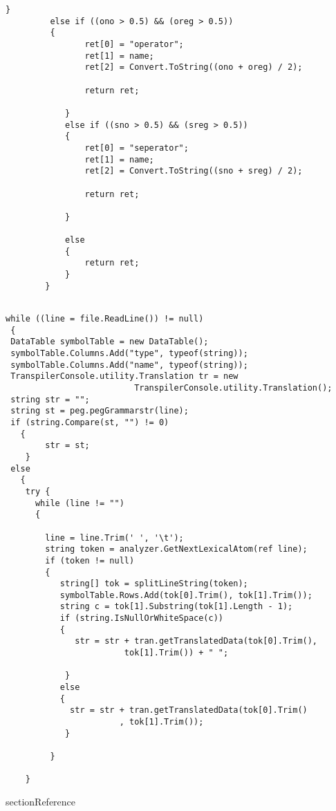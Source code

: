 \documentclass[23pt]{article}
\begin{document}
\begin{lstlisting}[label=some-code,caption= Code for training the system]
         }
         else if ((ono > 0.5) && (oreg > 0.5))
         {
                ret[0] = "operator";
                ret[1] = name;
                ret[2] = Convert.ToString((ono + oreg) / 2);

                return ret;

            }
            else if ((sno > 0.5) && (sreg > 0.5))
            {
                ret[0] = "seperator";
                ret[1] = name;
                ret[2] = Convert.ToString((sno + sreg) / 2);

                return ret;

            }

            else
            {
                return ret;
            }
        }

\end{lstlisting}

\begin{lstlisting}[label=some-code,caption= Reading the tokens from the file]

while ((line = file.ReadLine()) != null)
 {
 DataTable symbolTable = new DataTable();
 symbolTable.Columns.Add("type", typeof(string));
 symbolTable.Columns.Add("name", typeof(string));
 TranspilerConsole.utility.Translation tr = new 
                          TranspilerConsole.utility.Translation();
 string str = "";
 string st = peg.pegGrammarstr(line);
 if (string.Compare(st, "") != 0)
   {
        str = st;
    }
 else
   {
    try {
      while (line != "")
      {

        line = line.Trim(' ', '\t');
        string token = analyzer.GetNextLexicalAtom(ref line);
        if (token != null)
        {
           string[] tok = splitLineString(token);             
           symbolTable.Rows.Add(tok[0].Trim(), tok[1].Trim());
           string c = tok[1].Substring(tok[1].Length - 1);      
           if (string.IsNullOrWhiteSpace(c))
           {
              str = str + tran.getTranslatedData(tok[0].Trim(),
                        tok[1].Trim()) + " ";

            }
           else
           {
             str = str + tran.getTranslatedData(tok[0].Trim()
                       , tok[1].Trim());
            }

         }

    }                  

\end{lstlisting}




\newpage
section{Reference}
\end{document}
